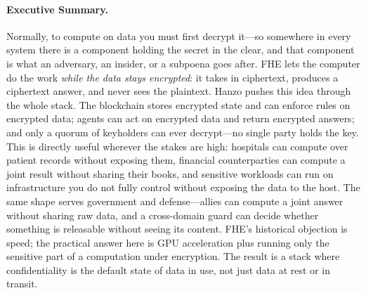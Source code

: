 \documentclass[11pt,letterpaper]{article}
\begin{document}
\makecover

\begin{abstract}
Every system that processes sensitive data has a moment where it holds the data
in the clear---and that moment is the insider risk, the cross-domain leak, and the
blast radius of every breach. Fully homomorphic encryption (FHE) removes that
moment: computation runs directly on ciphertext, and only a threshold of keyholders
can decrypt the result. This paper describes Hanzo's design for making FHE the
\emph{default} mode of computation across the two layers that normally demand
plaintext---a blockchain's state and rules, and an autonomous agent's actions---so
that state stays encrypted on-chain, policies are evaluated over ciphertext, and
agents act on data they are never able to read. We give the cryptographic basis
(BFV/BGV/CKKS/TFHE with threshold decryption), the GPU acceleration that makes it
practical, the post-quantum anchoring that protects it for the long term, the
applications it unlocks across regulated industry, multi-party commerce, and
government (defense included), and an explicit, honest assessment of which
components are production today versus an active research frontier.
\end{abstract}

\paragraph{Executive Summary.}
Normally, to compute on data you must first decrypt it---so somewhere in every
system there is a component holding the secret in the clear, and that component is
what an adversary, an insider, or a subpoena goes after. FHE lets the computer do
the work \emph{while the data stays encrypted}: it takes in ciphertext, produces a
ciphertext answer, and never sees the plaintext. Hanzo pushes this idea through the
whole stack. The blockchain stores encrypted state and can enforce rules on
encrypted data; agents can act on encrypted data and return encrypted answers; and
only a quorum of keyholders can ever decrypt---no single party holds the key. This
is directly useful wherever the stakes are high: hospitals can compute over
patient records without exposing them, financial counterparties can compute a
joint result without sharing their books, and sensitive workloads can run on
infrastructure you do not fully control without exposing the data to the host. The
same shape serves government and defense---allies can compute a joint answer
without sharing raw data, and a cross-domain guard can decide whether something is
releasable without seeing its content. FHE's historical objection is
speed; the practical answer here is GPU acceleration plus running only the
sensitive part of a computation under encryption. The result is a stack where
confidentiality is the default state of data in use, not just data at rest or in
transit.
\end{document}
